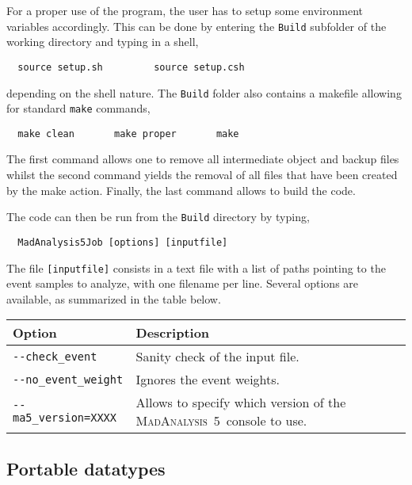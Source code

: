 \documentclass[a4paper]{article}
\newcommand{\MA}{\textsc{MadAnalysis}~5}
\begin{document}
For a proper use of the program, the user has to setup some environment
variables accordingly. This can be done by entering the \verb+Build+ subfolder
of the working directory and typing in a shell,
{\color{ao}\begin{verbatim}
  source setup.sh         source setup.csh
\end{verbatim}}
depending on the shell nature. The \verb+Build+ folder also contains a makefile
allowing for standard \verb+make+ commands,
{\color{ao}\begin{verbatim}
  make clean       make proper       make
\end{verbatim}}
The first command allows one to remove all intermediate object and backup
files whilst the second command yields the removal of all files that have been
created by the make action. Finally, the last command allows to build the code.

The code can then be run from the \verb+Build+
directory by typing,
{\color{ao}\begin{verbatim}
  MadAnalysis5Job [options] [inputfile]
\end{verbatim}}
The file {\color{ao}\verb?[inputfile]?} consists in a text file with a list of paths
pointing to the event samples to analyze, with one filename per line. Several
options are available, as summarized in the table below.
\renewcommand{\arraystretch}{1.2}%
\begin{center}\begin{tabular}{l p{8.4cm}}
\hline
Option & Description\\
\hline
\color{ao}\verb?--check_event?      & Sanity check of the input file.\\
\color{ao}\verb?--no_event_weight?  & Ignores the event weights.\\
\color{ao}\verb?--ma5_version=XXXX? & Allows to specify which version of the \MA\ console
  to use.\\
\hline
\end{tabular}
\end{center}
\newpage

\begin{shaded}
\section{\Large Portable datatypes}
\end{shaded}
\end{document}

